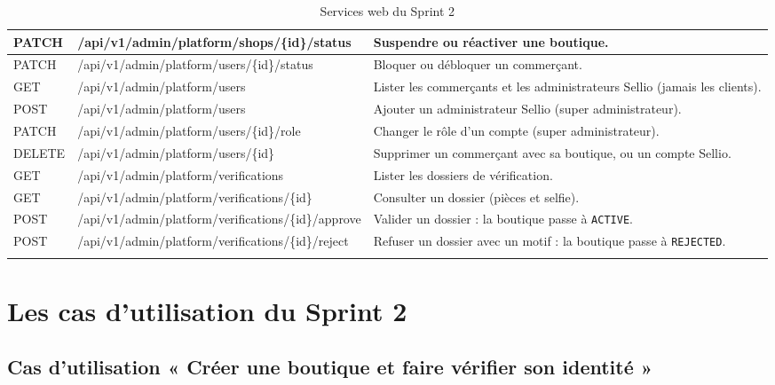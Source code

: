 \begin{longtable}{|p{1.8cm}|p{10cm}|p{3.8cm}|}
\hline
PATCH & /api/v1/admin/platform/shops/\{id\}/status & Suspendre ou réactiver une boutique. \\
\hline
PATCH & /api/v1/admin/platform/users/\{id\}/status & Bloquer ou débloquer un commerçant. \\
\hline
GET & /api/v1/admin/platform/users & Lister les commerçants et les administrateurs Sellio (jamais les clients). \\
\hline
POST & /api/v1/admin/platform/users & Ajouter un administrateur Sellio (super administrateur). \\
\hline
PATCH & /api/v1/admin/platform/users/\{id\}/role & Changer le rôle d'un compte (super administrateur). \\
\hline
DELETE & /api/v1/admin/platform/users/\{id\} & Supprimer un commerçant avec sa boutique, ou un compte Sellio. \\
\hline
GET & /api/v1/admin/platform/verifications & Lister les dossiers de vérification. \\
\hline
GET & /api/v1/admin/platform/verifications/\{id\} & Consulter un dossier (pièces et selfie). \\
\hline
POST & /api/v1/admin/platform/verifications/\{id\}/approve & Valider un dossier : la boutique passe à \texttt{ACTIVE}. \\
\hline
POST & /api/v1/admin/platform/verifications/\{id\}/reject & Refuser un dossier avec un motif : la boutique passe à \texttt{REJECTED}. \\
\hline
\caption{Services web du Sprint 2}
\label{tab:ws-sprint2}
\end{longtable}

\section{Les cas d'utilisation du Sprint 2}
\subsection{Cas d'utilisation « Créer une boutique et faire vérifier son identité »}
